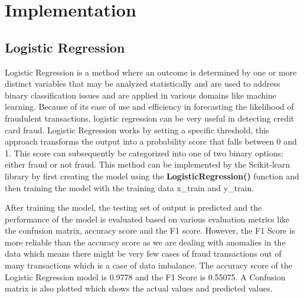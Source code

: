  
 



\section{Implementation}
\subsection{Logistic Regression}
 Logistic Regression is a method where an outcome is determined by one or more distinct variables that may be analyzed statistically and are used to address binary classification issues and are applied in various domains like machine learning. Because of its ease of use and efficiency in forecasting the likelihood of fraudulent transactions, logistic regression can be very useful in detecting credit card fraud. Logistic Regression works by setting a specific threshold, this approach transforms the output into a probability score that falls between 0 and 1. This score can subsequently be categorized into one of two binary options: either fraud or not fraud. This method can be implemented by the Scikit-learn library by first creating the model using the \textbf{LogisticRegression()} function and then training the model with the training data x\_train and y\_train.

 

 
After training the model, the testing set of output is predicted and the performance of the model is evaluated based on various evaluation metrics like the confusion matrix, accuracy score and the F1 score. However, the F1 Score is more reliable than the accuracy score as we are dealing with anomalies in the data which means there might be very few cases of fraud transactions out of many transactions which is a case of data imbalance. The accuracy score of the Logistic Regression model is 0.9778 and the F1 Score is 0.55075. A Confusion matrix is also plotted which shows the actual values and predicted values. 





